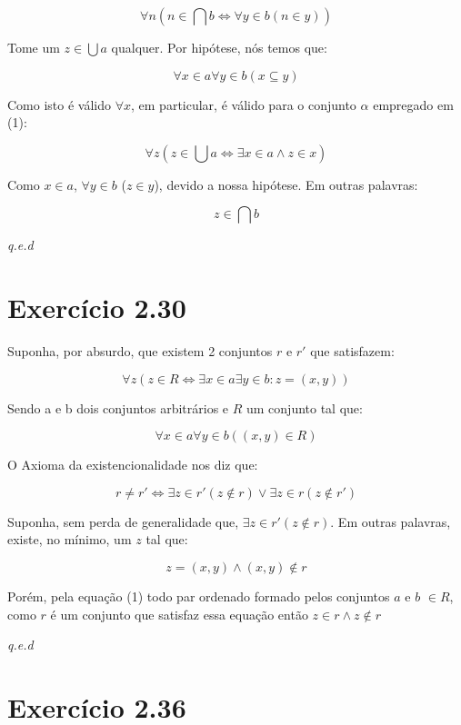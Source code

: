 \documentclass[12pt]{extarticle}
\newcommand{\fim}{\begin{flushright}

   \emph{q.e.d}
\end{flushright}}
\begin{document}
\begin{equation}
 \forall n (n \in \bigcap b \Leftrightarrow \forall y \in b (n \in y))   
\end{equation}

Tome um $z \in \bigcup a$ qualquer. Por hipótese, nós temos que:

$$\forall x \in a \forall y \in b (x \subseteq y)$$

Como isto é válido $\forall x$, em particular, é válido para o conjunto $\alpha$ empregado em (1): 

$$\forall z(z \in \bigcup a \Leftrightarrow \exists x \in a \land z \in x) $$

Como $x \in a$, $\forall y \in b$ ($z \in y$), devido a nossa hipótese. Em outras palavras:

$$z \in \bigcap b$$

\fim

\section{Exercício 2.30}

Suponha, por absurdo, que existem 2 conjuntos $r$ e $r'$ que satisfazem:

$$\forall z (z \in R \Leftrightarrow \exists x \in a \exists y \in b : z = (x,y))$$

Sendo a e b dois conjuntos arbitrários e $R$ um conjunto tal que:

\begin{equation}
  \forall x \in a \forall y \in b  ((x,y) \in R)  
\end{equation} \label{1}

 O Axioma da existencionalidade nos diz que:

$$ r \neq r' \Leftrightarrow \exists z \in r' ( z \notin r) \lor \exists z \in r ( z \notin r')$$

Suponha, sem perda de generalidade que, $\exists z \in r' (z \notin r)$. Em outras palavras, existe, no mínimo, um $z$ tal que:

$$z = (x,y) \land (x,y) \notin r$$

Porém, pela equação (1) todo par ordenado formado pelos conjuntos $a$ e $b$ $\in R$, como $r$ é um conjunto que satisfaz essa equação então $z \in r \land z \notin r$

\fim

\section{Exercício 2.36}
\end{document}

